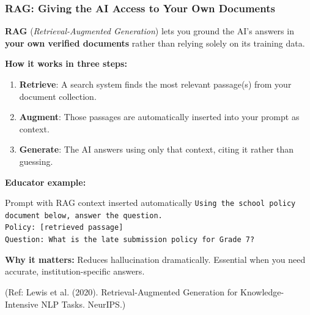 \begin{frame}[fragile]\frametitle{RAG: Giving the AI Access to Your Own Documents}

\textbf{RAG} (\emph{Retrieval-Augmented Generation}) lets you ground the AI's answers in \textbf{your own verified documents} rather than relying solely on its training data.

\medskip
\textbf{How it works in three steps:}
\begin{enumerate}
    \item \textbf{Retrieve}: A search system finds the most relevant passage(s) from your document collection.
    \item \textbf{Augment}: Those passages are automatically inserted into your prompt as context.
    \item \textbf{Generate}: The AI answers using only that context, citing it rather than guessing.
\end{enumerate}

\medskip
\textbf{Educator example:}
\begin{exampleblock}{Prompt with RAG context inserted automatically}
\small
\texttt{Using the school policy document below, answer the question. \\
Policy: [retrieved passage] \\
Question: What is the late submission policy for Grade 7?}
\end{exampleblock}

\medskip
\textbf{Why it matters:} Reduces hallucination dramatically. Essential when you need accurate, institution-specific answers.

{\tiny (Ref: Lewis et al. (2020). Retrieval-Augmented Generation for Knowledge-Intensive NLP Tasks. NeurIPS.)}

\end{frame}


